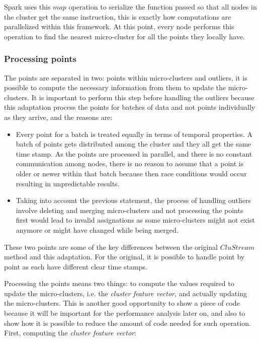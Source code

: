 Spark uses this $map$ operation to serialize the function passed so that all nodes in the cluster get the same instruction, this is exactly how computations are parallelized  within this framework. At this point, every node performs this operation to find the nearest micro-cluster for all the points they locally have.



\subsubsection{Processing points}\label{procpoints}

The points are separated in two: points within micro-clusters and outliers, it is possible to compute the necessary information from them to update the micro-clusters. It is important to perform this step before handling the outliers because this adaptation process the points for batches of data and not points individually as they arrive, and the reasons are:

\begin{itemize}
 \item Every point for a batch is treated equally in terms of temporal properties. A batch of points gets distributed among the cluster and they all get the same time stamp. As the points are processed in parallel, and there is no constant communication among nodes, there is no reason to assume that a point is older or newer within that batch because then race conditions would occur resulting in unpredictable results.
\item Taking into account the previous statement, the process of handling outliers involve deleting and merging micro-clusters and not processing the points first would lead to invalid assignations as some micro-clusters might not exist anymore or might have changed while being merged.
\end{itemize}

These two points are some of the key differences between the original $CluStream$ method and this adaptation. For the original, it is possible to handle point by point as each have different clear time stamps.

Processing the points means two things: to compute the values required to update the micro-clusters, i.e. the \textit{cluster feature vector}, and actually updating the micro-clusters. This is another good opportunity to show a piece of code because it will be important for the performance analysis later on, and also to show how it is possible to reduce the amount of code needed for such operation. First, computing the \textit{cluster feature vector}:

